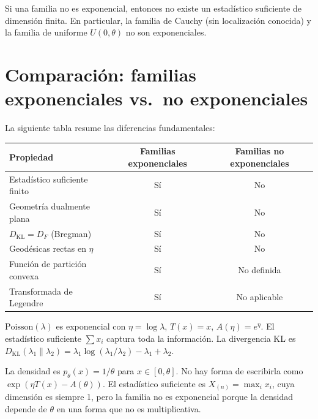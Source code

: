 \begin{corollary}
	Si una familia no es exponencial, entonces no existe un estadístico suficiente de dimensión finita.  En particular, la familia de Cauchy (sin localización conocida) y la familia de uniforme $U(0, \theta)$ no son exponenciales.
\end{corollary}

\section{Comparación: familias exponenciales vs.\ no exponenciales}

La siguiente tabla resume las diferencias fundamentales:

\begin{center}
	\renewcommand{\arraystretch}{1.3}
	\begin{tabular}{|l|c|c|}
		\hline
		\textbf{Propiedad} & \textbf{Familias exponenciales} & \textbf{Familias no exponenciales} \\
		\hline
		Estadístico suficiente finito & Sí & No \\
		Geometría dualmente plana & Sí & No \\
		$D_{\mathrm{KL}} = D_F$ (Bregman) & Sí & No \\
		Geodésicas rectas en $\eta$ & Sí & No \\
		Función de partición convexa & Sí & No definida \\
		Transformada de Legendre & Sí & No aplicable \\
		\hline
	\end{tabular}
\end{center}

\begin{example}
	$\mathrm{Poisson}(\lambda)$ es exponencial con $\eta = \log\lambda$, $T(x) = x$, $A(\eta) = e^\eta$.
	El estadístico suficiente $\sum x_i$ captura toda la información.  La divergencia KL es $D_{\mathrm{KL}}(\lambda_1 \| \lambda_2) = \lambda_1 \log(\lambda_1/\lambda_2) - \lambda_1 + \lambda_2$.
\end{example}

\begin{example}
	La densidad es $p_\theta(x) = 1/\theta$ para $x \in [0, \theta]$.  No hay forma de escribirla como $\exp(\eta T(x) - A(\theta))$.  El estadístico suficiente es $X_{(n)} = \max_i x_i$, cuya dimensión es siempre 1, pero la familia no es exponencial porque la densidad depende de $\theta$ en una forma que no es multiplicativa.
\end{example}

